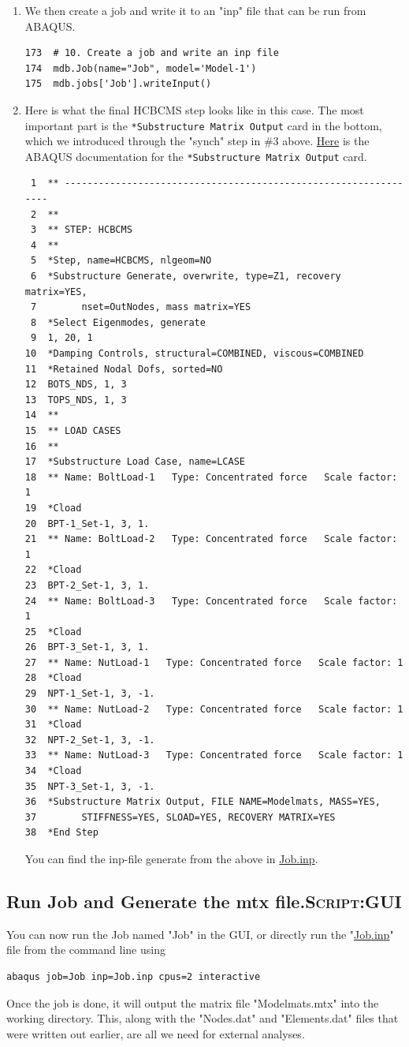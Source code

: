 \documentclass[11pt]{article}
\begin{document}
\begin{enumerate}
\item We then create a job and write it to an "inp" file that can be run from ABAQUS.
\begin{verbatim}
173  # 10. Create a job and write an inp file
174  mdb.Job(name="Job", model='Model-1')
175  mdb.jobs['Job'].writeInput()
\end{verbatim}
\item Here is what the final HCBCMS step looks like in this case.
The most important part is the \texttt{*Substructure Matrix Output} card in the bottom,
which we introduced through the "synch" step in \#3 above.
\href{https://classes.engineering.wustl.edu/2009/spring/mase5513/abaqus/docs/v6.6/books/key/default.htm?startat=ch18abk43.html}{Here} is the ABAQUS documentation for the \texttt{*Substructure Matrix Output} card.
\begin{verbatim}
 1  ** ----------------------------------------------------------------
 2  ** 
 3  ** STEP: HCBCMS
 4  ** 
 5  *Step, name=HCBCMS, nlgeom=NO
 6  *Substructure Generate, overwrite, type=Z1, recovery matrix=YES,
 7        nset=OutNodes, mass matrix=YES
 8  *Select Eigenmodes, generate
 9  1, 20, 1
10  *Damping Controls, structural=COMBINED, viscous=COMBINED
11  *Retained Nodal Dofs, sorted=NO
12  BOTS_NDS, 1, 3
13  TOPS_NDS, 1, 3
14  ** 
15  ** LOAD CASES
16  ** 
17  *Substructure Load Case, name=LCASE
18  ** Name: BoltLoad-1   Type: Concentrated force   Scale factor: 1
19  *Cload
20  BPT-1_Set-1, 3, 1.
21  ** Name: BoltLoad-2   Type: Concentrated force   Scale factor: 1
22  *Cload
23  BPT-2_Set-1, 3, 1.
24  ** Name: BoltLoad-3   Type: Concentrated force   Scale factor: 1
25  *Cload
26  BPT-3_Set-1, 3, 1.
27  ** Name: NutLoad-1   Type: Concentrated force   Scale factor: 1
28  *Cload
29  NPT-1_Set-1, 3, -1.
30  ** Name: NutLoad-2   Type: Concentrated force   Scale factor: 1
31  *Cload
32  NPT-2_Set-1, 3, -1.
33  ** Name: NutLoad-3   Type: Concentrated force   Scale factor: 1
34  *Cload
35  NPT-3_Set-1, 3, -1.
36  *Substructure Matrix Output, FILE NAME=Modelmats, MASS=YES,
37        STIFFNESS=YES, SLOAD=YES, RECOVERY MATRIX=YES
38  *End Step
\end{verbatim}
You can find the inp-file generate from the above in \href{https://github.com/Nidish96/Abaqus4Joints/blob/main/assets/demo/Job.inp}{Job.inp}.
\end{enumerate}
\subsection{Run Job and Generate the mtx file.\hfill{}\textsc{Script:GUI}}
\label{sec:org9b38cf0}
You can now run the Job named "Job" in the GUI, or directly run the "\href{https://github.com/Nidish96/Abaqus4Joints/blob/main/assets/demo/Job.inp}{Job.inp}" file from the command line using
\begin{verbatim}
abaqus job=Job inp=Job.inp cpus=2 interactive
\end{verbatim}
Once the job is done, it will output the matrix file "Modelmats.mtx" into the working directory.
This, along with the "Nodes.dat" and "Elements.dat" files that were written out earlier, are all we need for external analyses.
\end{document}
